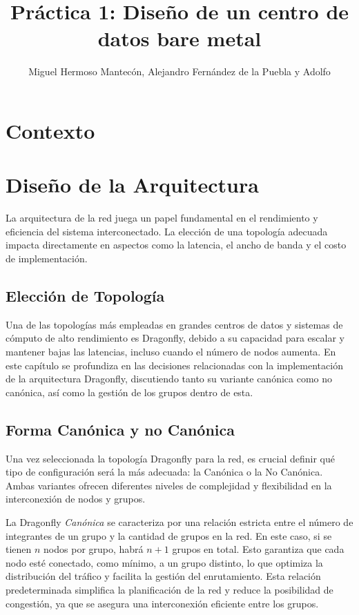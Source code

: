 \documentclass[%
    school=etsisi,%
    degree=61TI,%
]{upm-report}
\title{Práctica 1: Diseño de un centro de datos bare metal}
\author{Miguel Hermoso Mantecón, Alejandro Fernández de la Puebla y Adolfo}
\begin{document}
\chapter{Contexto}
\label{ch:contexto}




\chapter{Diseño de la Arquitectura}
\label{ch:diseño-arquitectura}

La arquitectura de la red juega un papel fundamental en el rendimiento y eficiencia del sistema interconectado. La elección de una topología adecuada impacta directamente en aspectos como la latencia, el ancho de banda y el costo de implementación. 

\section{Elección de Topología}
\label{sec:elección-topología}

Una de las topologías más empleadas en grandes centros de datos y sistemas de cómputo de alto rendimiento es Dragonfly, debido a su capacidad para escalar y mantener bajas las latencias, incluso cuando el número de nodos aumenta. En este capítulo se profundiza en las decisiones relacionadas con la implementación de la arquitectura Dragonfly, discutiendo tanto su variante canónica como no canónica, así como la gestión de los grupos dentro de esta.

\section{Forma Canónica y no Canónica}
\label{sec:dragonfly}

Una vez seleccionada la topología Dragonfly para la red, es crucial definir qué tipo de configuración será la más adecuada: la Canónica o la No Canónica. Ambas variantes ofrecen diferentes niveles de complejidad y flexibilidad en la interconexión de nodos y grupos.

La Dragonfly \textit{Canónica} se caracteriza por una relación estricta entre el número de integrantes de un grupo y la cantidad de grupos en la red. En este caso, si se tienen $n$ nodos por grupo, habrá $n+1$ grupos en total. Esto garantiza que cada nodo esté conectado, como mínimo, a un grupo distinto, lo que optimiza la distribución del tráfico y facilita la gestión del enrutamiento. Esta relación predeterminada simplifica la planificación de la red y reduce la posibilidad de congestión, ya que se asegura una interconexión eficiente entre los grupos.
\end{document}
